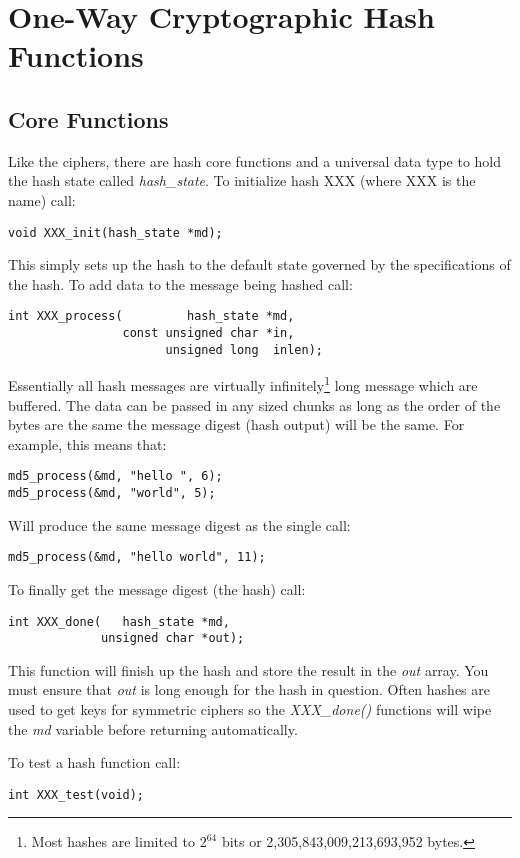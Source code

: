 \documentclass[synpaper]{book}
\newcommand{\mysection}[1]    %
	{                   %
	\section{#1}
   \markboth{\textsf{www.libtom.org}}{\thesection ~ {#1}}
	}
\begin{document}
\chapter{One-Way Cryptographic Hash Functions}
\mysection{Core Functions}
Like the ciphers, there are hash core functions and a universal data type to hold the hash state called \textit{hash\_state}.  To initialize hash 
XXX (where XXX is the name) call:
\begin{verbatim}
void XXX_init(hash_state *md);
\end{verbatim}

This simply sets up the hash to the default state governed by the specifications of the hash.  To add data to the message being hashed call:
\begin{verbatim}
int XXX_process(         hash_state *md, 
                const unsigned char *in, 
                      unsigned long  inlen);
\end{verbatim}
Essentially all hash messages are virtually infinitely\footnote{Most hashes are limited to $2^{64}$ bits or 2,305,843,009,213,693,952 bytes.} long message which 
are buffered.  The data can be passed in any sized chunks as long as the order of the bytes are the same the message digest (hash output) will be the same.  For example, 
this means that:
\begin{verbatim}
md5_process(&md, "hello ", 6);
md5_process(&md, "world", 5);
\end{verbatim}
Will produce the same message digest as the single call:
\begin{verbatim}
md5_process(&md, "hello world", 11);
\end{verbatim}

To finally get the message digest (the hash) call:
\begin{verbatim}
int XXX_done(   hash_state *md, 
             unsigned char *out);
\end{verbatim}

This function will finish up the hash and store the result in the \textit{out} array.  You must ensure that \textit{out} is long
enough for the hash in question.  Often hashes are used to get keys for symmetric ciphers so the \textit{XXX\_done()} functions
will wipe the \textit{md} variable before returning automatically.

To test a hash function call:
\begin{verbatim}
int XXX_test(void);
\end{verbatim}
\end{document}
